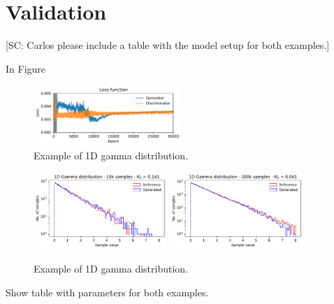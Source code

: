 \documentclass[twocolumn,preprintnumbers,superscriptaddress]{revtex4-2}
\begin{document}
\section{Validation}
\label{sec:validation}

{\color{red}[SC: Carlos please include a table with the model setup for both examples.]}

In Figure

\begin{figure}
  \includegraphics[width=0.5\textwidth]{plots/1Dgamma/1Dgamma_loss.pdf}
  \caption{Example of 1D gamma distribution.}
\end{figure}

\begin{figure}
  \includegraphics[width=0.45\textwidth]{plots/1Dgamma/1Dgamma_distribution_10k.pdf}
  \includegraphics[width=0.45\textwidth]{plots/1Dgamma/1Dgamma_distribution_100k.pdf}
  \caption{Example of 1D gamma distribution.}
\end{figure}

Show table with parameters for both examples.
\end{document}
